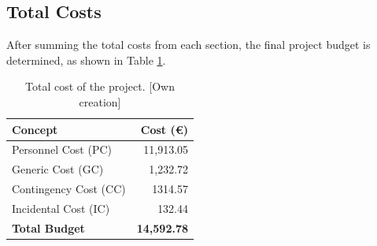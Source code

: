 \subsection{Total Costs}
\label{sec:total-cost}

After summing the total costs from each section, the final project budget is determined, as shown in Table \ref{table:total-cost-of-project}.

\vspace{-1em}

\begin{table}[H]
    \renewcommand{\arraystretch}{1.2}
    \centering
    \footnotesize
    \begin{tabular}{@{}l r@{}}
     \textbf{Concept} & \textbf{Cost (€)} \\ [6pt]
     \hline 
     Personnel Cost (PC) & 11,913.05  \\
     Generic Cost (GC) & 1,232.72  \\
     Contingency Cost (CC) & 1314.57  \\
     Incidental Cost (IC) & 132.44  \\
     \hline
     \textbf{Total Budget} & \textbf{14,592.78}  \\
    \end{tabular}%
    \caption[Total cost of the project]
    {Total cost of the project. [Own creation]} 
    \vspace{-1em}
    \label{table:total-cost-of-project}
\end{table}

\vspace{-15pt}

